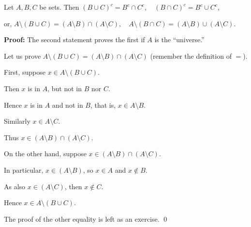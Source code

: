 \documentclass[10pt,aspectratio=169]{beamer}
\begin{document}
\begin{frame}
\begin{center}
\end{center}
\end{frame}

\begin{frame}
\begin{theorem}[DeMorgan]
Let $A, B, C$ be sets.  Then
\quad
${(B \cup C)}^c = B^c \cap C^c , \quad
{(B \cap C)}^c = B^c \cup C^c$,

\medskip
\pause

or,
\quad
$A \setminus (B \cup C) = (A \setminus B) \cap (A \setminus C) , \quad
A \setminus (B \cap C) = (A \setminus B) \cup (A \setminus C)$.
\end{theorem}

\pause
\textbf{Proof:}
The second statement proves the first if $A$ is the ``universe.''

\medskip
\pause

Let us prove $A \setminus (B \cup C) = (A \setminus B) \cap (A \setminus C)$
\quad (remember the definition of $=$).

\medskip
\pause

%
%
%

First, suppose
$x \in A \setminus (B \cup C)$.

\pause

Then $x$ is in $A$, but not in $B$ nor $C$.

\pause

Hence $x$ is in $A$ and not in $B$, that is, $x \in A \setminus B$.

\pause

Similarly $x \in A \setminus C$.

\pause

Thus $x \in (A \setminus B) \cap (A \setminus C)$.

\medskip
\pause

On the other hand, suppose 
$x \in (A \setminus B) \cap (A \setminus C)$.

\pause

In particular, $x \in (A \setminus B)$, so $x \in A$ and $x \notin B$.

\pause

As also $x \in (A \setminus C)$, then $x \notin C$.

\pause

Hence $x \in A \setminus (B \cup C)$.

\medskip
\pause

The proof of the other equality is left as an exercise.
\qed
\end{frame}
\end{document}
